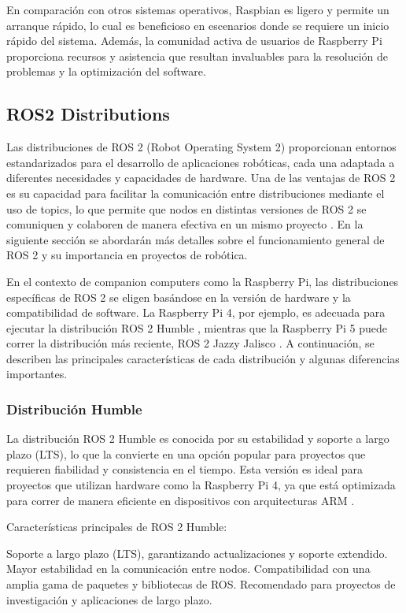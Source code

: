     En comparación con otros sistemas operativos, Raspbian es ligero y permite un arranque rápido, lo cual es beneficioso en escenarios donde se requiere un inicio rápido del sistema. Además, la comunidad activa de usuarios de Raspberry Pi proporciona recursos y asistencia que resultan invaluables para la resolución de problemas y la optimización del software.


\subsection{ROS2 Distributions}
    Las distribuciones de ROS 2 (Robot Operating System 2) proporcionan entornos estandarizados para el desarrollo de aplicaciones robóticas, cada una adaptada a diferentes necesidades y capacidades de hardware. Una de las ventajas de ROS 2 es su capacidad para facilitar la comunicación entre distribuciones mediante el uso de topics, lo que permite que nodos en distintas versiones de ROS 2 se comuniquen y colaboren de manera efectiva en un mismo proyecto \cite{ros_docs}. En la siguiente sección se abordarán más detalles sobre el funcionamiento general de ROS 2 y su importancia en proyectos de robótica.

    En el contexto de companion computers como la Raspberry Pi, las distribuciones específicas de ROS 2 se eligen basándose en la versión de hardware y la compatibilidad de software. La Raspberry Pi 4, por ejemplo, es adecuada para ejecutar la distribución ROS 2 Humble \cite{raspberry_docs}, mientras que la Raspberry Pi 5 puede correr la distribución más reciente, ROS 2 Jazzy Jalisco \cite{ros_docs}. A continuación, se describen las principales características de cada distribución y algunas diferencias importantes.
    \subsubsection{Distribución Humble}

    La distribución ROS 2 Humble es conocida por su estabilidad y soporte a largo plazo (LTS), lo que la convierte en una opción popular para proyectos que requieren fiabilidad y consistencia en el tiempo. Esta versión es ideal para proyectos que utilizan hardware como la Raspberry Pi 4, ya que está optimizada para correr de manera eficiente en dispositivos con arquitecturas ARM \cite{humble_documentation}.

    Características principales de ROS 2 Humble:

    Soporte a largo plazo (LTS), garantizando actualizaciones y soporte extendido.
    Mayor estabilidad en la comunicación entre nodos.
    Compatibilidad con una amplia gama de paquetes y bibliotecas de ROS.
    Recomendado para proyectos de investigación y aplicaciones de largo plazo.

